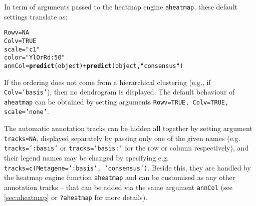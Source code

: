 \documentclass[a4paper]{article}\usepackage[]{graphicx}\usepackage[]{color}
\makeatletter
\newcommand{\hlnum}[1]{\textcolor[rgb]{0.686,0.059,0.569}{#1}}%
\newcommand{\hlstr}[1]{\textcolor[rgb]{0.192,0.494,0.8}{#1}}%
\newcommand{\hlopt}[1]{\textcolor[rgb]{0,0,0}{#1}}%
\newcommand{\hlstd}[1]{\textcolor[rgb]{0.345,0.345,0.345}{#1}}%
\newcommand{\hlkwb}[1]{\textcolor[rgb]{0.69,0.353,0.396}{#1}}%
\newcommand{\hlkwd}[1]{\textcolor[rgb]{0.737,0.353,0.396}{\textbf{#1}}}%
\newenvironment{kframe}{%
 \def\at@end@of@kframe{}%
 \ifinner\ifhmode%
  \def\at@end@of@kframe{\end{minipage}}%
  \begin{minipage}{\columnwidth}%
 \fi\fi%
 \def\FrameCommand##1{\hskip\@totalleftmargin \hskip-\fboxsep
 \colorbox{shadecolor}{##1}\hskip-\fboxsep
     \hskip-\linewidth \hskip-\@totalleftmargin \hskip\columnwidth}%
 \MakeFramed {\advance\hsize-\width
   \@totalleftmargin\z@ \linewidth\hsize
   \@setminipage}}%
 {\par\unskip\endMakeFramed%
 \at@end@of@kframe}
\newenvironment{knitrout}{}{} %
\let\code=\texttt
\makeatother
\begin{document}
In term of arguments passed to the heatmap engine \code{aheatmap}, these default 
settings translate as:

\begin{knitrout}
\color{fgcolor}\begin{kframe}
\begin{alltt}
\hlstd{Rowv} \hlkwb{=} \hlnum{NA}
\hlstd{Colv} \hlkwb{=} \hlnum{TRUE}
\hlstd{scale} \hlkwb{=} \hlstr{"c1"}
\hlstd{color} \hlkwb{=} \hlstr{"YlOrRd:50"}
\hlstd{annCol} \hlkwb{=} \hlkwd{predict}\hlstd{(object)} \hlopt{+} \hlkwd{predict}\hlstd{(object,} \hlstr{"consensus"}\hlstd{)}
\end{alltt}
\end{kframe}
\end{knitrout}


If the ordering does not come from a hierarchical clustering (e.g., if
\code{Colv='basis'}), then no dendrogram is displayed.
The default behaviour of \code{aheatmap} can be obtained by setting arguments 
\code{Rowv=TRUE, Colv=TRUE, scale='none'}.

\medskip
The automatic annotation tracks can be hidden all together by setting argument 
\code{tracks=NA}, displayed separately by passing only one of the given names 
(e.g. \code{tracks=':basis'} or \code{tracks='basis:'} for the row or column respectively),
and their legend names may be changed by
specifying e.g. \code{tracks=c(Metagene=':basis', 'consensus')}.
Beside this, they are handled by the heatmap engine function \code{aheatmap} 
and can be customised as any other annotation tracks -- that can be added via 
the same argument \code{annCol} (see \cref{sec:aheatmap} or \code{?aheatmap} for
more details).
\end{document}
